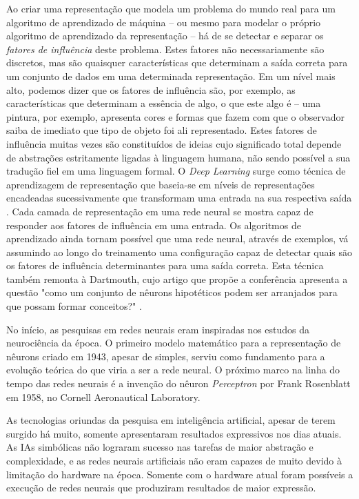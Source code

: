\documentclass[12pt, a4paper]{article}
\begin{document}
Ao criar uma representação que modela um problema do mundo real para um algoritmo de aprendizado de máquina -- ou mesmo para modelar o próprio algoritmo de aprendizado da representação -- há de se detectar e separar os \emph{fatores de influência} deste problema. Estes fatores não necessariamente são discretos, mas são quaisquer características que determinam a saída correta para um conjunto de dados em uma determinada representação. Em um nível mais alto, podemos dizer que os fatores de influência são, por exemplo, as características que determinam a essência de algo, o que este algo é -- uma pintura, por exemplo, apresenta cores e formas que fazem com que o observador saiba de imediato que tipo de objeto foi ali representado. Estes fatores de influência muitas vezes são constituídos de ideias cujo significado total depende de abstrações estritamente ligadas à linguagem humana, não sendo possível a sua tradução fiel em uma linguagem formal. O \emph{Deep Learning} surge como técnica de aprendizagem de representação que baseia-se em níveis de representações encadeadas sucessivamente que transformam uma entrada na sua respectiva saída \cite{Goodfellow-et-al-2016}. Cada camada de representação em uma rede neural se mostra capaz de responder aos fatores de influência em uma entrada. Os algoritmos de aprendizado ainda tornam possível que uma rede neural, através de exemplos, vá assumindo ao longo do treinamento uma configuração capaz de detectar quais são os fatores de influência determinantes para uma saída correta. 
Esta técnica também remonta à Dartmouth, cujo artigo que propõe a conferência apresenta a questão "como um conjunto de nêurons hipotéticos podem ser arranjados para que possam formar conceitos?" \cite{dartmouth}.

No início, as pesquisas em redes neurais eram inspiradas nos estudos da neurociência da época. O primeiro modelo matemático para a representação de nêurons \cite{mcculloch_pitts} criado em 1943, apesar de simples, serviu como fundamento para a evolução teórica do que viria a ser a rede neural. O próximo marco na linha do tempo das redes neurais é a invenção do nêuron \emph{Perceptron} por Frank Rosenblatt em 1958, no Cornell Aeronautical Laboratory.

As tecnologias oriundas da pesquisa em inteligência artificial, apesar de terem surgido há muito, somente apresentaram resultados expressivos nos dias atuais. As IAs simbólicas não lograram sucesso nas tarefas de maior abstração e complexidade, e as redes neurais artificiais não eram capazes de muito devido à limitação do hardware na época. Somente com o hardware atual foram possíveis a execução de redes neurais que produziram resultados de maior expressão.
\end{document}
